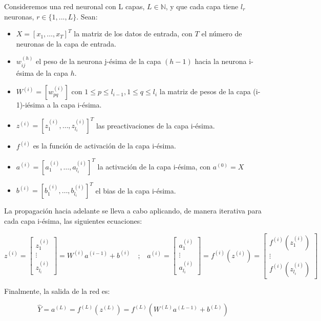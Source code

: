\documentclass[12pt,twoside]{article}
\begin{document}
Consideremos una red neuronal con L capas, $L \in \mathbb{N}$, y que cada capa tiene $l_r$ neuronas, $r \in \{1, ..., L\}$. Sean:

\begin{itemize}
    \item $X = [x_1, \dots, x_{T}]^T$ la matriz de los datos de entrada, con $T$ el número de neuronas de la capa de entrada.
    \item $w_{ij}^{(h)}$ el peso de la neurona j-ésima de la capa $(h-1)$ hacia la neurona i-ésima de la capa $h$.
    \item $W^{(i)} = [w_{pq}^{(i)}]$ con $1 \leq p \leq l_{i-1},1 \leq q \leq l_{i}$ la matriz de pesos de la capa (i-1)-iésima a la capa i-ésima.
    \item $z^{(i)} = [z_1^{(i)}, \dots, z_{l_i}^{(i)}]^T$ las preactivaciones de la capa i-ésima.
    \item $f^{(i)}$ es la función de activación de la capa i-ésima.
    \item $a^{(i)} = [a_1^{(i)}, \dots, a_{l_i}^{(i)}]^T$ la activación de la capa i-ésima, con $a^{(0)} = X$
    \item $b^{(i)} = [b_1^{(i)}, \dots, b_{l_i}^{(i)}]^T$ el bias de la capa i-ésima.
\end{itemize}

La propagación hacia adelante se lleva a cabo aplicando, de manera iterativa para cada capa i-ésima, las siguientes ecuaciones:

\begin{equation}
z^{(i)} =
\begin{bmatrix}
z_1^{(i)} \\
\vdots \\
z_{l_i}^{(i)}
\end{bmatrix}
=
W^{(i)} a^{(i-1)} + b^{(i)}
\quad \text{;} \quad
a^{(i)} = 
\begin{bmatrix}
a_1^{(i)} \\
\vdots \\
a_{l_i}^{(i)}
\end{bmatrix}
=
f^{(i)}(z^{(i)})
=
\begin{bmatrix}
f^{(i)}(z_1^{(i)}) \\
\vdots \\
f^{(i)}(z_{l_i}^{(i)})
\end{bmatrix}
\end{equation}

Finalmente, la salida de la red es:

\begin{equation}
\hat{Y}=a^{(L)}= f^{(L)}(z^{(L)}) = f^{(L)}(W^{(L)}a^{(L-1)} + b^{(L)})
\end{equation}
\end{document}
